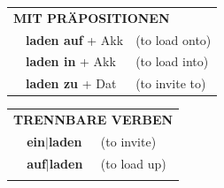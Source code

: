 \documentclass[10pt,a4paper]{revtex4-2}
\begin{document}
\begin{verbbox-acc}
 \vspace{10pt}

\begin{tabular}{lll}
      \multicolumn{3}{l}{\textbf{MIT PRÄPOSITIONEN}}\\
& \textbf{laden auf} + Akk & (to load onto)\\
& \textbf{laden in} + Akk & (to load into)\\
& \textbf{laden zu} + Dat & (to invite to)\\
\end{tabular}
  \hfill
\begin{tabular}{lll}
      \multicolumn{3}{l}{\textbf{TRENNBARE VERBEN}}\\
 & \textbf{ein$|$laden} & (to invite)\\
 & \textbf{auf$|$laden} & (to load up)\\
\vspace{10pt}
  \end{tabular}
  
  \vspace{-5pt}

\end{verbbox-acc}
\end{document}

